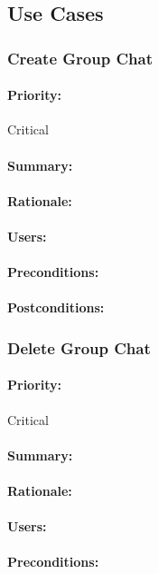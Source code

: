 \documentclass[11pt]{article}
\begin{document}
\subsection{Use Cases}
\subsubsection{Create Group Chat} \label{UC-create-group}
\paragraph{Priority:}Critical
\paragraph{Summary:}
\paragraph{Rationale:}
\paragraph{Users:}
\paragraph{Preconditions:}
\paragraph{{Postconditions:}}
\subsubsection{Delete Group Chat} \label{UC-delete-group}
\paragraph{Priority:}Critical
\paragraph{Summary:}
\paragraph{Rationale:}
\paragraph{Users:}
\paragraph{Preconditions:}
\end{document}
